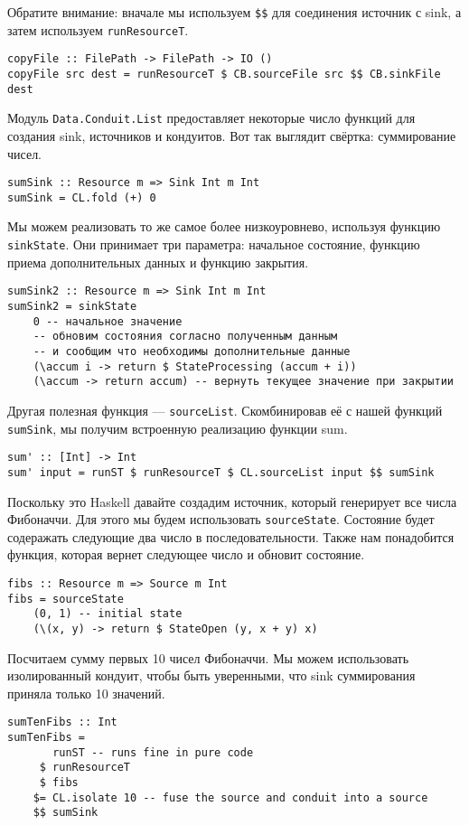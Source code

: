 Обратите внимание: вначале мы используем \verb=$$= для соединения источник с sink, а
затем используем \lstinline=runResourceT=.
\begin{lstlisting}
copyFile :: FilePath -> FilePath -> IO ()
copyFile src dest = runResourceT $ CB.sourceFile src $$ CB.sinkFile dest
\end{lstlisting}
Модуль \lstinline=Data.Conduit.List= предоставляет некоторые число функций для создания
sink,
источников и кондуитов. Вот так выглядит свёртка: суммирование чисел.
\begin{lstlisting}
sumSink :: Resource m => Sink Int m Int
sumSink = CL.fold (+) 0
\end{lstlisting}
Мы можем реализовать то же самое более низкоуровнево, используя функцию \verb=sinkState=.
Они принимает три параметра: начальное состояние, функцию приема дополнительных данных и
функцию закрытия.
\begin{lstlisting}
sumSink2 :: Resource m => Sink Int m Int
sumSink2 = sinkState
    0 -- начальное значение
    -- обновим состояния согласно полученным данным 
    -- и сообщим что необходимы дополнительные данные
    (\accum i -> return $ StateProcessing (accum + i))
    (\accum -> return accum) -- вернуть текущее значение при закрытии
\end{lstlisting}
Другая полезная функция --- \verb=sourceList=. Скомбинировав её с нашей функций
\verb=sumSink=, мы получим встроенную реализацию функции sum.
\begin{lstlisting}
sum' :: [Int] -> Int
sum' input = runST $ runResourceT $ CL.sourceList input $$ sumSink
\end{lstlisting}
Поскольку это Haskell давайте создадим источник, который генерирует все числа Фибоначчи.
Для этого мы будем использовать \lstinline=sourceState=. Состояние будет содеражать
следующие два
число в последовательности. Также нам понадобится функция, которая вернет следующее число
и обновит состояние.
\begin{lstlisting}fibs :: Resource m => Source m Int
fibs = sourceState
    (0, 1) -- initial state
    (\(x, y) -> return $ StateOpen (y, x + y) x)
\end{lstlisting}
Посчитаем сумму первых 10 чисел Фибоначчи. Мы можем использовать изолированный кондуит,
чтобы быть уверенными, что sink суммирования приняла только 10 значений.
\begin{lstlisting}sumTenFibs :: Int
sumTenFibs =
       runST -- runs fine in pure code
     $ runResourceT
     $ fibs
    $= CL.isolate 10 -- fuse the source and conduit into a source
    $$ sumSink
\end{lstlisting}
